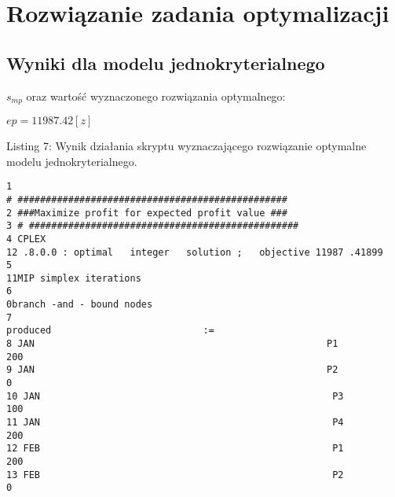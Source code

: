 \documentclass[12pt]{article}
\begin{document}
\section{Rozwiązanie zadania optymalizacji}

\subsection{Wyniki dla modelu jednokryterialnego}

$s_{mp}$ oraz wartość wyznaczonego rozwiązania optymalnego:

$ep = 11987.42[z]$

Listing 7: Wynik działania skryptu wyznaczającego rozwiązanie optymalne modelu jednokryterialnego.

\begin{verbatim}
1                                                                        # ################################################         
2 ###Maximize profit for expected profit value ###                                    
3 # ################################################                                                    
4 CPLEX                                                                   12 .8.0.0 : optimal   integer   solution ;   objective 11987 .41899  
5                                                                         11MIP simplex iterations                                                     
6                                                                         0branch -and - bound nodes                                                     
7                                                                         produced                           :=                                                 
8 JAN                                                    P1                                 200                                                     
9 JAN                                                    P2                                 0                                                     
10 JAN                                                    P3                                 100                                                     
11 JAN                                                    P4                                 200                                                     
12 FEB                                                    P1                                 200                                                     
13 FEB                                                    P2                                 0                                                     

\end{verbatim}
\end{document}
